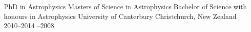 

\begin{cventries}

  \cventry
    {PhD in Astrophysics \newline Masters of Science in Astrophysics \newline Bachelor of Science with honours in Astrophysics\newline} %
    {University of Canterbury} %
    {Christchurch, New Zealand} %
    {2010--2014  --2008\newline} %
    {
    }

\end{cventries}
